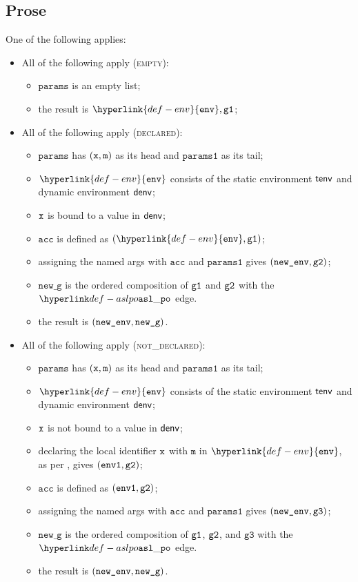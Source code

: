 \documentclass{book}
\newcommand\env[0]{\hyperlink{def-env}{\texttt{env}}}
\newcommand\newg[0]{\texttt{new\_g}}
\newcommand\vm[0]{\texttt{m}}
\newcommand\vgthree[0]{\texttt{g3}}
\newcommand\params[0]{\texttt{params}}
\newcommand\paramsone[0]{\texttt{params1}}
\newcommand\vacc[0]{\texttt{acc}}
\begin{document}
\subsection{Prose}
One of the following applies:
\begin{itemize}
  \item All of the following apply (\textsc{empty}):
  \begin{itemize}
    \item $\params$ is an empty list;
    \item the result is $\env, \vgone$;
  \end{itemize}

  \item All of the following apply (\textsc{declared}):
  \begin{itemize}
    \item $\params$ has $(\vx,\vm)$ as its head and $\paramsone$ as its tail;
    \item $\env$ consists of the static environment $\textsf{tenv}$ and dynamic environment $\textsf{denv}$;
    \item $\texttt{x}$ is bound to a value in $\textsf{denv}$;
    \item $\vacc$ is defined as $(\env,\vgone)$;
    \item assigning the named args with $\vacc$ and $\paramsone$ gives $(\texttt{new\_env}, \texttt{g2})$;
    \item $\newg$ is the ordered composition of $\texttt{g1}$ and $\texttt{g2}$ with the $\aslpo$ edge.
    \item the result is $(\newenv, \newg)$.
  \end{itemize}

  \item All of the following apply (\textsc{not\_declared}):
  \begin{itemize}
    \item $\params$ has $(\vx,\vm)$ as its head and $\paramsone$ as its tail;
    \item $\env$ consists of the static environment $\textsf{tenv}$ and dynamic environment $\textsf{denv}$;
    \item $\texttt{x}$ is not bound to a value in $\textsf{denv}$;
    \item declaring the local identifier $\texttt{x}$ with $\vm$ in $\env$, as per ,
    gives $(\texttt{env1}, \texttt{g2})$;
    \item $\vacc$ is defined as $(\texttt{env1},\texttt{g2})$;
    \item assigning the named args with $\vacc$ and $\paramsone$ gives $(\newenv, \vgthree)$;
    \item $\newg$ is the ordered composition of $\texttt{g1}$, $\texttt{g2}$, and $\vgthree$ with the $\aslpo$ edge.
    \item the result is $(\newenv, \newg)$.
  \end{itemize}
\end{itemize}
\end{document}
